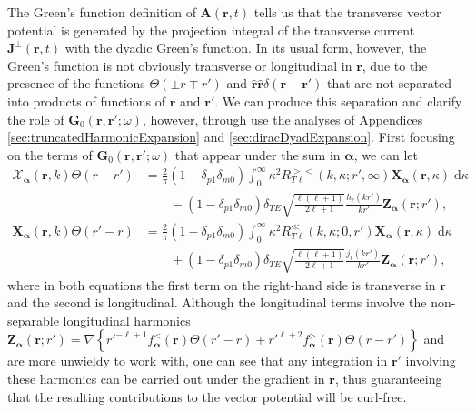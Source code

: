 \documentclass{article}
\begin{document}
The Green's function definition of $\mathbf{A}(\mathbf{r},t)$ tells us that the transverse vector potential is generated by the projection integral of the transverse current $\mathbf{J}^\perp(\mathbf{r},t)$ with the dyadic Green's function. In its usual form, however, the Green's function is not obviously transverse or longitudinal in $\mathbf{r}$, due to the presence of the functions $\Theta(\pm r \mp r')$ and $\hat{\mathbf{r}}\hat{\mathbf{r}}\delta(\mathbf{r} - \mathbf{r}')$ that are not separated into products of functions of $\mathbf{r}$ and $\mathbf{r}'$. We can produce this separation and clarify the role of $\mathbf{G}_0(\mathbf{r},\mathbf{r}';\omega)$, however, through use the analyses of Appendices \ref{sec:truncatedHarmonicExpansion} and \ref{sec:diracDyadExpansion}. First focusing on the terms of $\mathbf{G}_0(\mathbf{r},\mathbf{r}';\omega)$ that appear under the sum in $\bm{\alpha}$, we can let
\begin{equation}
\begin{split}
\bm{\mathcal{X}}_{\bm{\alpha}}(\mathbf{r},k)\Theta(r - r') &= \frac{2}{\pi}(1 - \delta_{p1}\delta_{m0})\int_0^\infty\kappa^2R_{T\ell}^{><}(k,\kappa;r',\infty)\mathbf{X}_{\bm{\alpha}}(\mathbf{r},\kappa)\;\mathrm{d}\kappa\\
&\qquad- (1 - \delta_{p1}\delta_{m0})\delta_{TE}\sqrt{\frac{\ell(\ell + 1)}{2\ell + 1}}\frac{h_\ell(kr')}{kr'}\mathbf{Z}_{\bm{\alpha}}(\mathbf{r};r'),\\[1.0em]
\mathbf{X}_{\bm{\alpha}}(\mathbf{r},k)\Theta(r' - r) &= \frac{2}{\pi}(1 - \delta_{p1}\delta_{m0})\int_0^\infty\kappa^2R_{T\ell}^\ll(k,\kappa;0,r')\mathbf{X}_{\bm{\alpha}}(\mathbf{r},\kappa)\;\mathrm{d}\kappa\\
&\qquad + (1 - \delta_{p1}\delta_{m0})\delta_{TE}\sqrt{\frac{\ell(\ell + 1)}{2\ell + 1}}\frac{j_\ell(kr')}{kr'}\mathbf{Z}_{\bm{\alpha}}(\mathbf{r};r'),
\end{split}
\end{equation}
where in both equations the first term on the right-hand side is transverse in $\mathbf{r}$ and the second is longitudinal. Although the longitudinal terms involve the non-separable longitudinal harmonics $\mathbf{Z}_{\bm{\alpha}}(\mathbf{r};r') = \nabla\left\{r'^{-\ell + 1} f_{\bm{\alpha}}^<(\mathbf{r})\Theta(r' - r) + r'^{\ell + 2} f_{\bm{\alpha}}^>(\mathbf{r})\Theta(r - r')\right\}$ and are more unwieldy to work with, one can see that any integration in $\mathbf{r}'$ involving these harmonics can be carried out under the gradient in $\mathbf{r}$, thus guaranteeing that the resulting contributions to the vector potential will be curl-free.
\end{document}
